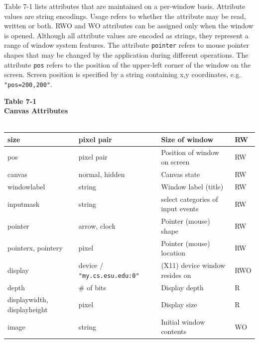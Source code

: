 Table 7-1 lists attributes that are maintained on a per-window basis.
Attribute values are string encodings. Usage refers to whether the
attribute may be read, written or both. RWO and WO attributes can be
assigned only when the window is opened.  Although all attribute
values are encoded as strings, they represent a range of window system
features. The attribute \texttt{pointer} refers to mouse pointer
shapes that may be changed by the application during different
operations. The attribute \texttt{pos} refers to the position of the
upper-left corner of the window on the screen. Screen position is
specified by a string containing x,y coordinates,
e.g. \texttt{"pos=200,200"}.

\pagebreak

\begin{center}
{\sffamily\bfseries Table 7-1} \\
{\sffamily\bfseries Canvas Attributes} \\
\ \\ 
  \begin{xtabular}{|m{1.03in}|m{1.9in}|m{2.24in}|m{0.44835988in}|}
    size & pixel pair & Size of window & RW \\\hline
    pos & pixel pair & Position of window on screen & RW \\\hline
    canvas & normal, hidden & Canvas state & RW\\\hline
    windowlabel & string & Window label (title) & RW \\\hline
    inputmask & string & select categories of input events & RW \\\hline
    pointer & arrow, clock & Pointer (mouse) shape  & RW \\\hline
    pointerx, pointery & pixel & Pointer (mouse) location & RW \\\hline
    display & device / \texttt{"my.cs.esu.edu:0"} & (X11) device window resides on & RWO \\\hline
    depth & \# of bits & Display depth & R \\\hline
    displaywidth, displayheight & pixel & Display size & R \\\hline
    image & string & Initial window contents & WO \\\hline
  \end{xtabular}
\end{center}


